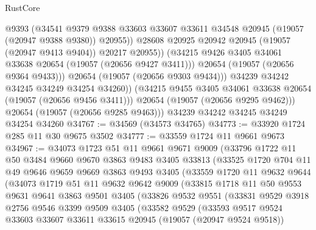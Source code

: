 \begin{lexlean}{RustCore}
\begin{coremodule}
                      @9393
                      (@34541
                        @9379
                        @9388
                        @33603
                        @33607
                        @33611
                        @34548
                        @20945
                        (@19057 (@20947 @9388 @9380))
                        @20955))
                    @28608
                    @20925
                    @20942
                    @20945
                    (@19057 (@20947 @9413 @9404))
                    @20217
                    @20955))
                (@34215 @9426 @3405 @34061 @33638 @20654 (@19057 (@20656 @9427 @3411)))
                @20654
                (@19057 (@20656 @9364 @9433)))
              @20654
              (@19057 (@20656 @9303 @9434)))
            @34239
            @34242
            @34245
            @34249
            @34254
            @34260))
        (@34215 @9455 @3405 @34061 @33638 @20654 (@19057 (@20656 @9456 @3411)))
        @20654
        (@19057 (@20656 @9295 @9462)))
      @20654
      (@19057 (@20656 @9285 @9463)))
    @34239
    @34242
    @34245
    @34249
    @34254
    @34260
@34767 := @34569 (@34573 @34765)
@34773 := @33920 @1724 @285 @11 @30 @9675 @3502
@34777 := @33559 @1724 @11 @9661 @9673
@34967 := @34073
    @1723
    @51
    @11
    @9661
    @9671
    @9009
    (@33796
      @1722
      @11
      @50
      @3484
      @9660
      @9670
      @3863
      @9483
      @3405
      @33813
      (@33525
        @1720
        @704
        @11
        @49
        @9646
        @9659
        @9669
        @3863
        @9493
        @3405
        (@33559
          @1720
          @11
          @9632
          @9644
          (@34073
            @1719
            @51
            @11
            @9632
            @9642
            @9009
            (@33815
              @1718
              @11
              @50
              @9553
              @9631
              @9641
              @3863
              @9501
              @3405
              (@33826
                @9532
                @9551
                (@33831
                  @9529
                  @3918
                  @2756
                  @9546
                  @3399
                  @9509
                  @3405
                  (@33582
                    @9529
                    (@33593
                      @9517
                      @9524
                      @33603
                      @33607
                      @33611
                      @33615
                      @20945
                      (@19057 (@20947 @9524 @9518))

\end{coremodule}
\end{lexlean}
